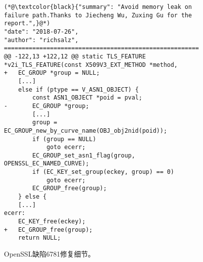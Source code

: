 \begin{figure}[!b]
	\centering
	\begin{lstlisting}
(*@\textcolor{black}{"summary": "Avoid memory leak on failure path.Thanks to Jiecheng Wu, Zuxing Gu for the report.",}@*)
"date": "2018-07-26",
"author": "richsalz",
=======================================================
@@ -122,13 +122,12 @@ static TLS_FEATURE *v2i_TLS_FEATURE(const X509V3_EXT_METHOD *method,
+   EC_GROUP *group = NULL;
	[...]
	else if (ptype == V_ASN1_OBJECT) {
		const ASN1_OBJECT *poid = pval;
-		EC_GROUP *group;
		[...]
		group = EC_GROUP_new_by_curve_name(OBJ_obj2nid(poid));
		if (group == NULL)
			goto ecerr;
		EC_GROUP_set_asn1_flag(group, OPENSSL_EC_NAMED_CURVE);
		if (EC_KEY_set_group(eckey, group) == 0)
			goto ecerr;
		EC_GROUP_free(group);
	} else {
	[...]
ecerr:
	EC_KEY_free(eckey);
+	EC_GROUP_free(group);
	return NULL;
	\end{lstlisting}
	\caption{
		OpenSSL缺陷6781修复细节。
	}
	\label{fig:4-4-openssl-example-fix}
\end{figure}